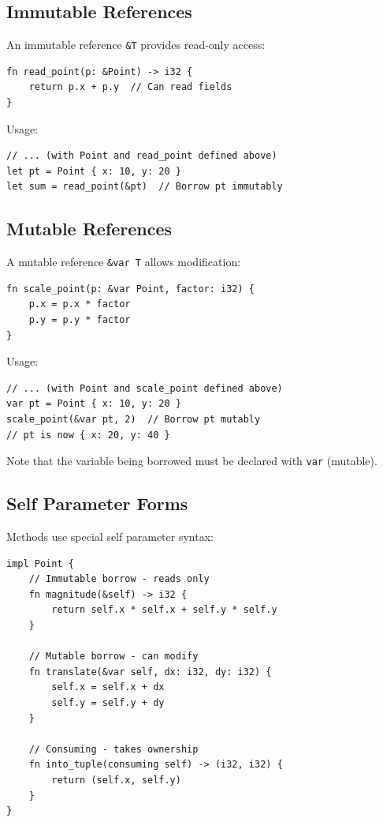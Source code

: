 \subsection{Immutable References}

An immutable reference \texttt{\&T} provides read-only access:

\begin{lstlisting}
fn read_point(p: &Point) -> i32 {
    return p.x + p.y  // Can read fields
}
\end{lstlisting}

Usage:

\begin{lstlisting}
// ... (with Point and read_point defined above)
let pt = Point { x: 10, y: 20 }
let sum = read_point(&pt)  // Borrow pt immutably
\end{lstlisting}

\subsection{Mutable References}

A mutable reference \texttt{\&var T} allows modification:

\begin{lstlisting}
fn scale_point(p: &var Point, factor: i32) {
    p.x = p.x * factor
    p.y = p.y * factor
}
\end{lstlisting}

Usage:

\begin{lstlisting}
// ... (with Point and scale_point defined above)
var pt = Point { x: 10, y: 20 }
scale_point(&var pt, 2)  // Borrow pt mutably
// pt is now { x: 20, y: 40 }
\end{lstlisting}

Note that the variable being borrowed must be declared with \texttt{var} (mutable).

\subsection{Self Parameter Forms}

Methods use special self parameter syntax:

\begin{lstlisting}
impl Point {
    // Immutable borrow - reads only
    fn magnitude(&self) -> i32 {
        return self.x * self.x + self.y * self.y
    }

    // Mutable borrow - can modify
    fn translate(&var self, dx: i32, dy: i32) {
        self.x = self.x + dx
        self.y = self.y + dy
    }

    // Consuming - takes ownership
    fn into_tuple(consuming self) -> (i32, i32) {
        return (self.x, self.y)
    }
}
\end{lstlisting}

